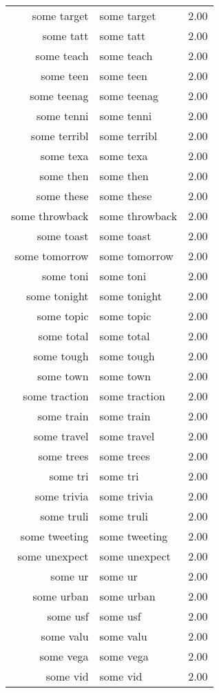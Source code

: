 \begin{table}[ht]
\begin{tabular}{rlr}
  some target & some target & 2.00 \\ 
  some tatt & some tatt & 2.00 \\ 
  some teach & some teach & 2.00 \\ 
  some teen & some teen & 2.00 \\ 
  some teenag & some teenag & 2.00 \\ 
  some tenni & some tenni & 2.00 \\ 
  some terribl & some terribl & 2.00 \\ 
  some texa & some texa & 2.00 \\ 
  some then & some then & 2.00 \\ 
  some these & some these & 2.00 \\ 
  some throwback & some throwback & 2.00 \\ 
  some toast & some toast & 2.00 \\ 
  some tomorrow & some tomorrow & 2.00 \\ 
  some toni & some toni & 2.00 \\ 
  some tonight & some tonight & 2.00 \\ 
  some topic & some topic & 2.00 \\ 
  some total & some total & 2.00 \\ 
  some tough & some tough & 2.00 \\ 
  some town & some town & 2.00 \\ 
  some traction & some traction & 2.00 \\ 
  some train & some train & 2.00 \\ 
  some travel & some travel & 2.00 \\ 
  some trees & some trees & 2.00 \\ 
  some tri & some tri & 2.00 \\ 
  some trivia & some trivia & 2.00 \\ 
  some truli & some truli & 2.00 \\ 
  some tweeting & some tweeting & 2.00 \\ 
  some unexpect & some unexpect & 2.00 \\ 
  some ur & some ur & 2.00 \\ 
  some urban & some urban & 2.00 \\ 
  some usf & some usf & 2.00 \\ 
  some valu & some valu & 2.00 \\ 
  some vega & some vega & 2.00 \\ 
  some vid & some vid & 2.00 \\ 

\end{tabular}
\end{table}
